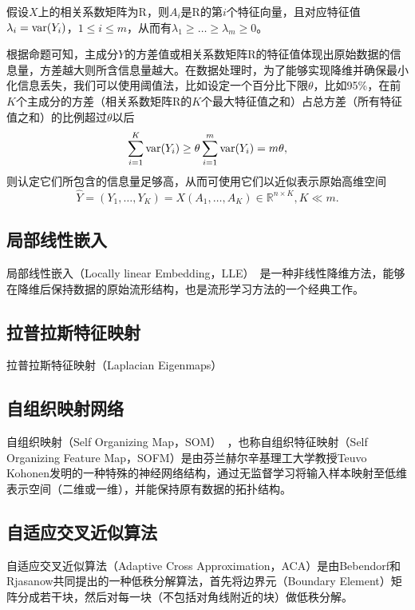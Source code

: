 \begin{proposition}
假设$X$上的相关系数矩阵为R，则$A_i$是R的第$i$个特征向量，且对应特征值$\lambda_i = \operatorname{\mathrm{var}}(Y_i)$，$1\le i\le m$，从而有$\lambda_1\ge \ldots \ge \lambda_m \ge 0$。
\end{proposition}

根据命题可知，主成分$Y$的方差值或相关系数矩阵R的特征值体现出原始数据的信息量，方差越大则所含信息量越大。在数据处理时，为了能够实现降维并确保最小化信息丢失，我们可以使用阈值法，比如设定一个百分比下限$\theta$，比如95\%，在前$K$个主成分的方差（相关系数矩阵R的$K$个最大特征值之和）占总方差（所有特征值之和）的比例超过$\theta$以后
\[
    \sum\limits_{i=1}^K \operatorname{\mathrm{var}}(Y_i) \ge \theta \sum\limits_{i=1}^m \operatorname{\mathrm{var}}(Y_i) = m \theta,
\]
则认定它们所包含的信息量足够高，从而可使用它们以近似表示原始高维空间
\begin{equation}\label{eq:pca-appr}
  \widehat Y = (Y_1,\ldots, Y_K) = X(A_1,\ldots,A_K)\in \mathbb R^{n\times K}, K \ll m.
\end{equation}

\subsection{局部线性嵌入}
局部线性嵌入（Locally linear Embedding，LLE）~\cite{belkin2001laplacian}是一种非线性降维方法，能够在降维后保持数据的原始流形结构，也是流形学习方法的一个经典工作。

\subsection{拉普拉斯特征映射}
拉普拉斯特征映射（Laplacian Eigenmaps）

\subsection{自组织映射网络}
自组织映射（Self Organizing Map，SOM）~\cite{kohonen1982self}，也称自组织特征映射（Self Organizing Feature Map，SOFM）是由芬兰赫尔辛基理工大学教授Teuvo Kohonen发明的一种特殊的神经网络结构，通过无监督学习将输入样本映射至低维表示空间（二维或一维），并能保持原有数据的拓扑结构。

\subsection{自适应交叉近似算法}
自适应交叉近似算法（Adaptive Cross Approximation，ACA）是由Bebendorf和Rjasanow\cite{bebendorf2003adaptive}共同提出的一种低秩分解算法，首先将边界元（Boundary Element）矩阵分成若干块，然后对每一块（不包括对角线附近的块）做低秩分解。

